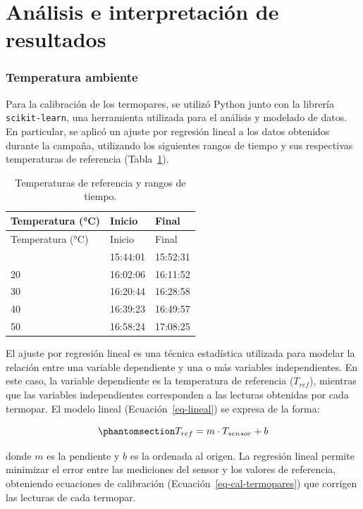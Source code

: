 \documentclass[
  letterpaper,
]{scrbook}
\begin{document}
\section{Análisis e interpretación de
resultados}\label{anuxe1lisis-e-interpretaciuxf3n-de-resultados}

\subsubsection{Temperatura ambiente}\label{temperatura-ambiente-1}

Para la calibración de los termopares, se utilizó Python junto con la
librería \texttt{scikit-learn}, una herramienta utilizada para el
análisis y modelado de datos. En particular, se aplicó un ajuste por
regresión lineal a los datos obtenidos durante la campaña, utilizando
los siguientes rangos de tiempo y sus respectivas temperaturas de
referencia (Tabla~\ref{tbl-temperaturas}).

\begin{longtable}[]{@{}lll@{}}
\caption{Temperaturas de referencia y rangos de
tiempo.}\label{tbl-temperaturas}\tabularnewline
\toprule\noalign{}
Temperatura (°C) & Inicio & Final \\
\midrule\noalign{}
\endfirsthead
\toprule\noalign{}
Temperatura (°C) & Inicio & Final \\
\midrule\noalign{}
\endhead
\bottomrule\noalign{}
\endlastfoot
10 & 15:44:01 & 15:52:31 \\
20 & 16:02:06 & 16:11:52 \\
30 & 16:20:44 & 16:28:58 \\
40 & 16:39:23 & 16:49:57 \\
50 & 16:58:24 & 17:08:25 \\
\end{longtable}

El ajuste por regresión lineal es una técnica estadística utilizada para
modelar la relación entre una variable dependiente y una o más variables
independientes. En este caso, la variable dependiente es la temperatura
de referencia (\(T_{ref}\)), mientras que las variables independientes
corresponden a las lecturas obtenidas por cada termopar. El modelo
lineal (Ecuación~\ref{eq-lineal}) se expresa de la forma:

\begin{equation}\phantomsection\label{eq-lineal}{
T_{ref} = m \cdot T_{sensor} + b
}\end{equation}

donde \(m\) es la pendiente y \(b\) es la ordenada al origen. La
regresión lineal permite minimizar el error entre las mediciones del
sensor y los valores de referencia, obteniendo ecuaciones de calibración
(Ecuación~\ref{eq-cal-termopares}) que corrigen las lecturas de cada
termopar.
\end{document}
